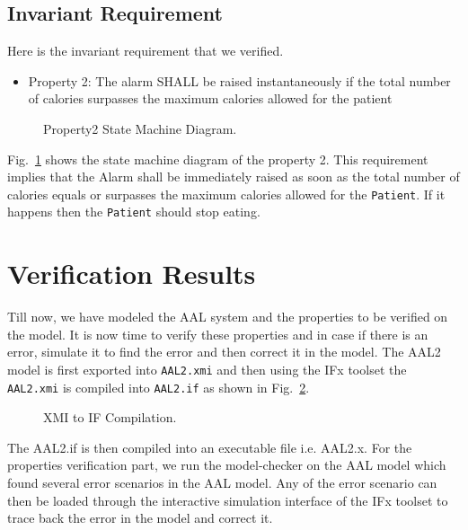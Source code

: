 \documentclass[a4paper,twoside]{article}
\begin{document}
\subsection{Invariant Requirement}
Here is the invariant requirement that we verified.

\begin{itemize}
\item Property 2: The alarm SHALL be raised instantaneously if the total number of calories surpasses the maximum calories allowed for the patient 
\end{itemize}

\begin{figure}[!h]
  \centering
  {}
  \caption{Property2 State Machine Diagram.}
  \label{fig:property3stm}
 \end{figure}
 
  
Fig.~\ref{fig:property3stm} shows the state machine diagram of the property 2. This requirement implies that the Alarm shall be immediately raised as soon as the total number of calories equals or surpasses the maximum calories allowed for the \texttt{Patient}. If it happens then the \texttt{Patient} should stop eating.  

\section{Verification Results}
\label{sec:results}
\noindent Till now, we have modeled the AAL system and the properties to be verified on the model. It is now time to verify these properties and in case if there is an error, simulate it to find the error and then correct it in the model. The AAL2 model is first exported into \texttt{AAL2.xmi} and then using the IFx toolset the \texttt{AAL2.xmi} is compiled into \texttt{AAL2.if} as shown in Fig.~\ref{fig:xmi2if}.

\begin{figure}[!h]
  \centering
  {}
  \caption{XMI to IF Compilation.}
  \label{fig:xmi2if}
 \end{figure}
  
 
The AAL2.if is then compiled into an executable file i.e. AAL2.x. For the properties verification part, we run the model-checker on the AAL model which found several error scenarios in the AAL model. Any of the error scenario can then be loaded through the interactive simulation interface of the IFx toolset to trace back the error in the model and correct it. 
\end{document}
